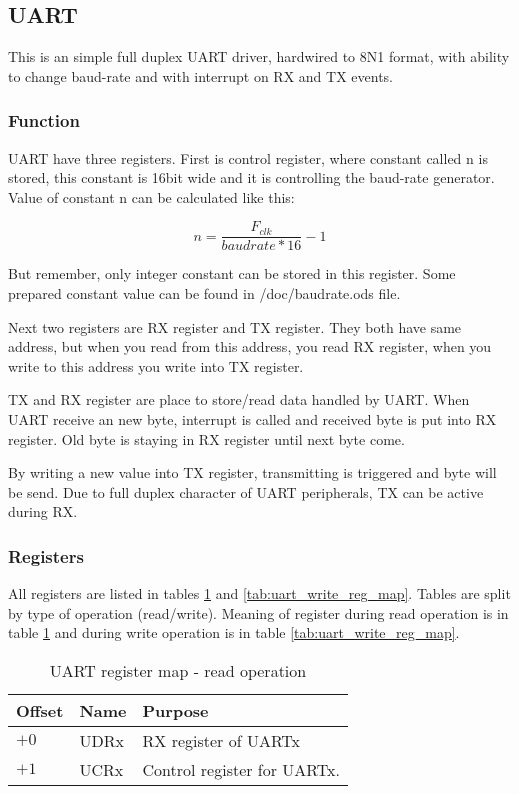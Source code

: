 \subsection{UART}

This is an simple full duplex UART driver, hardwired to 8N1 format, with
ability to change baud-rate and with interrupt on RX and TX events.

\subsubsection{Function}

UART have three registers. First is control register, where constant called n
is stored, this constant is 16bit wide and it is controlling the baud-rate
generator. Value of constant n can be calculated like this:

$$
    n = \frac{F_{clk}}{baudrate*16} - 1
$$

But remember, only integer constant can be stored in this register. Some
prepared constant value can be found in /doc/baudrate.ods file.

Next two registers are RX register and TX register. They both have same
address, but when you read from this address, you read RX register, when you
write to this address you write into TX register.

TX and RX register are place to store/read data handled by UART. When UART
receive an new byte, interrupt is called and received byte is put into RX
register. Old byte is staying in RX register until next byte come.

By writing a new value into TX register, transmitting is triggered and byte
will be send. Due to full duplex character of UART peripherals, TX can be
active during RX.

\subsubsection{Registers}

All registers are listed in tables \ref{tab:uart_read_reg_map} and
\ref{tab:uart_write_reg_map}. Tables are split by type of operation
(read/write). Meaning of register during read operation is in table
\ref{tab:uart_read_reg_map} and during write operation is in table
\ref{tab:uart_write_reg_map}.

\begin{table}[h]
    \centering
    \begin{tabular}{|l|l|l|}
        \hline
        \textbf{Offset} & \textbf{Name} & \textbf{Purpose}            \\ \hline
        $+0$            & UDRx          & RX register of UARTx        \\ \hline
        $+1$            & UCRx          & Control register for UARTx. \\ \hline
    \end{tabular}
    \caption{UART register map - read operation}
    \label{tab:uart_read_reg_map}
\end{table}

